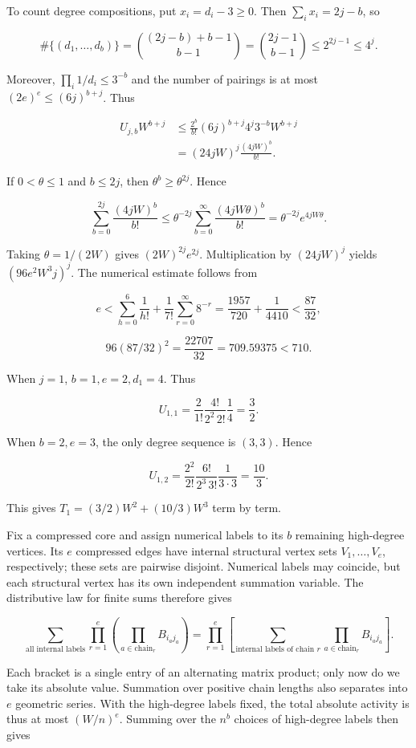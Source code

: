 \documentclass[11pt,a4paper]{article}
\begin{document}
To count degree compositions, put \(x_i=d_i-3\ge0\). Then \(\sum_ix_i=2j-b\), so

\[
\#\{(d_1,\ldots,d_b)\}=\binom{(2j-b)+b-1}{b-1}
=\binom{2j-1}{b-1}\le2^{2j-1}\le4^j.
\]

Moreover, \(\prod_i1/d_i\le3^{-b}\) and the number of pairings is at most \((2e)^e\le(6j)^{b+j}\). Thus

\[
\begin{aligned}
U_{j,b}W^{b+j}
&\le\frac{2^b}{b!}(6j)^{b+j}4^j3^{-b}W^{b+j}\\
&=(24jW)^j\frac{(4jW)^b}{b!}.
\end{aligned}
\]

If \(0<\theta\le1\) and \(b\le2j\), then \(\theta^b\ge\theta^{2j}\). Hence

\[
\sum_{b=0}^{2j}\frac{(4jW)^b}{b!}
\le\theta^{-2j}\sum_{b=0}^{\infty}\frac{(4jW\theta)^b}{b!}
=\theta^{-2j}e^{4jW\theta}.
\]

Taking \(\theta=1/(2W)\) gives \((2W)^{2j}e^{2j}\). Multiplication by \((24jW)^j\) yields \((96e^2W^3j)^j\). The numerical estimate follows from

\[
e<\sum_{h=0}^6\frac1{h!}+\frac1{7!}\sum_{r=0}^{\infty}8^{-r}
=\frac{1957}{720}+\frac1{4410}<\frac{87}{32},
\]

\[
96(87/32)^2=\frac{22707}{32}=709.59375<710.
\]

When \(j=1\), \(b=1,e=2,d_1=4\). Thus

\[
U_{1,1}=\frac2{1!}\frac{4!}{2^2\,2!}\frac14=\frac32.
\]

When \(b=2,e=3\), the only degree sequence is \((3,3)\). Hence

\[
U_{1,2}=\frac{2^2}{2!}\frac{6!}{2^3\,3!}\frac1{3\cdot3}=\frac{10}{3}.
\]

This gives \(T_1=(3/2)W^2+(10/3)W^3\) term by term.

Fix a compressed core and assign numerical labels to its \(b\) remaining high-degree vertices. Its \(e\) compressed edges have internal structural vertex sets \(V_1,\ldots,V_e\), respectively; these sets are pairwise disjoint. Numerical labels may coincide, but each structural vertex has its own independent summation variable. The distributive law for finite sums therefore gives

\[
\sum_{\text{all internal labels}}\prod_{r=1}^e
\left(\prod_{a\in\mathrm{chain}_r}B_{i_aj_a}\right)
=\prod_{r=1}^e\left[
\sum_{\text{internal labels of chain }r\text{}}
\prod_{a\in\mathrm{chain}_r}B_{i_aj_a}\right].
\]

Each bracket is a single entry of an alternating matrix product; only now do we take its absolute value. Summation over positive chain lengths also separates into \(e\) geometric series. With the high-degree labels fixed, the total absolute activity is thus at most \((W/n)^e\). Summing over the \(n^b\) choices of high-degree labels then gives
\end{document}
